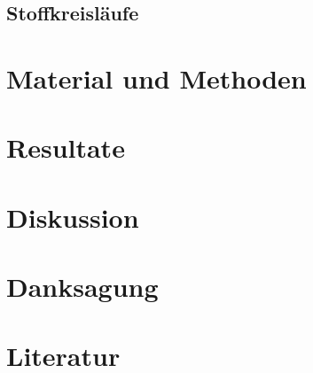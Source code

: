 \documentclass{article}
\begin{document}
\subsection{Stoffkreisläufe}


\section{Material und Methoden}

\section{Resultate}

\section{Diskussion}

\section{Danksagung}

\section{Literatur}
\end{document}
